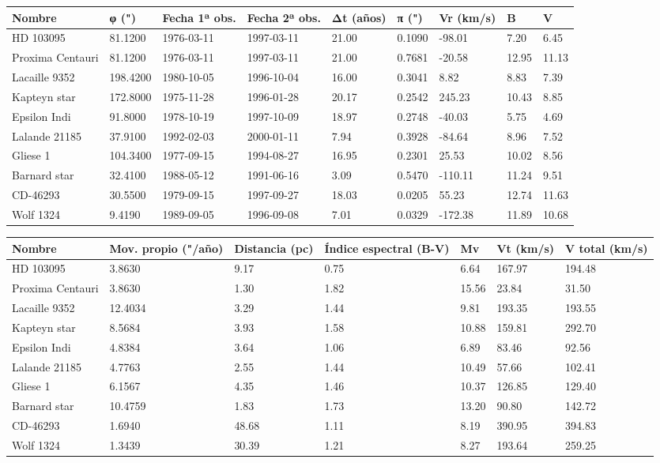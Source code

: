 \begin{tabular}{lllllllll}
\toprule
Nombre & φ (") & Fecha 1ª obs. & Fecha 2ª obs. & Δt (años) & π (") & Vr (km/s) & B & V \\
\midrule
HD 103095 & 81.1200 & 1976-03-11 & 1997-03-11 & 21.00 & 0.1090 & -98.01 & 7.20 & 6.45 \\
Proxima Centauri & 81.1200 & 1976-03-11 & 1997-03-11 & 21.00 & 0.7681 & -20.58 & 12.95 & 11.13 \\
Lacaille 9352 & 198.4200 & 1980-10-05 & 1996-10-04 & 16.00 & 0.3041 & 8.82 & 8.83 & 7.39 \\
Kapteyn star & 172.8000 & 1975-11-28 & 1996-01-28 & 20.17 & 0.2542 & 245.23 & 10.43 & 8.85 \\
Epsilon Indi & 91.8000 & 1978-10-19 & 1997-10-09 & 18.97 & 0.2748 & -40.03 & 5.75 & 4.69 \\
Lalande 21185 & 37.9100 & 1992-02-03 & 2000-01-11 & 7.94 & 0.3928 & -84.64 & 8.96 & 7.52 \\
Gliese 1 & 104.3400 & 1977-09-15 & 1994-08-27 & 16.95 & 0.2301 & 25.53 & 10.02 & 8.56 \\
Barnard star & 32.4100 & 1988-05-12 & 1991-06-16 & 3.09 & 0.5470 & -110.11 & 11.24 & 9.51 \\
CD-46293 & 30.5500 & 1979-09-15 & 1997-09-27 & 18.03 & 0.0205 & 55.23 & 12.74 & 11.63 \\
Wolf 1324 & 9.4190 & 1989-09-05 & 1996-09-08 & 7.01 & 0.0329 & -172.38 & 11.89 & 10.68 \\
\bottomrule
\end{tabular}


\begin{tabular}{lllllll}
\toprule
Nombre & Mov. propio ("/año) & Distancia (pc) & Índice espectral (B-V) & Mv & Vt (km/s) & V total (km/s) \\
\midrule
HD 103095 & 3.8630 & 9.17 & 0.75 & 6.64 & 167.97 & 194.48 \\
Proxima Centauri & 3.8630 & 1.30 & 1.82 & 15.56 & 23.84 & 31.50 \\
Lacaille 9352 & 12.4034 & 3.29 & 1.44 & 9.81 & 193.35 & 193.55 \\
Kapteyn star & 8.5684 & 3.93 & 1.58 & 10.88 & 159.81 & 292.70 \\
Epsilon Indi & 4.8384 & 3.64 & 1.06 & 6.89 & 83.46 & 92.56 \\
Lalande 21185 & 4.7763 & 2.55 & 1.44 & 10.49 & 57.66 & 102.41 \\
Gliese 1 & 6.1567 & 4.35 & 1.46 & 10.37 & 126.85 & 129.40 \\
Barnard star & 10.4759 & 1.83 & 1.73 & 13.20 & 90.80 & 142.72 \\
CD-46293 & 1.6940 & 48.68 & 1.11 & 8.19 & 390.95 & 394.83 \\
Wolf 1324 & 1.3439 & 30.39 & 1.21 & 8.27 & 193.64 & 259.25 \\
\bottomrule
\end{tabular}
